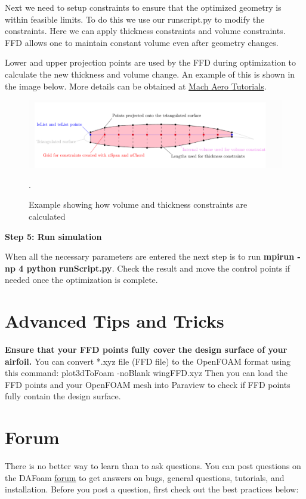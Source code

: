 \documentclass[12pt]{article}
\begin{document}
\noindent Next we need to setup constraints to ensure that the optimized geometry is within feasible limits. To do this we use our runscript.py to modify the constraints. Here we can apply thickness constraints and volume constraints. FFD allows one to maintain constant volume even after geometry changes. \vspace{4mm}
 
\noindent Lower and upper projection points are used by the FFD during optimization to calculate the new thickness and volume change. An example of this is shown in the image below. More details can be obtained at \href{https://mdolab-mach-aero.readthedocs-hosted.com/en/latest/machAeroTutorials/opt_aero.html#geometric-constraints}{Mach Aero Tutorials}. \vspace{4mm}
 
 \begin{figure}[ht]
    \centering
    \includegraphics[width=1.0\textwidth]{thicknessconstraint.PNG}
    \caption{Example showing how volume and thickness constraints are calculated \cite{machaero2021}}.
    \label{fig:my_label}
\end{figure}
 
 
 \noindent \textbf{Step 5: Run simulation}
 
\noindent When all the necessary parameters are entered the next step is to run \textbf{mpirun -np 4 python runScript.py}. Check the result and move the control points if needed once the optimization is complete.

\section{Advanced Tips and Tricks}
\textbf{Ensure that your FFD points fully cover the design surface of your airfoil.} 
You can convert *.xyz file (FFD file) to the OpenFOAM format using this command: plot3dToFoam -noBlank wingFFD.xyz  Then you can load the FFD points and your OpenFOAM mesh into Paraview to check if FFD points fully contain the design surface.\vspace{4mm}

\section{Forum}
There is no better way to learn than to ask questions. You can post questions on the DAFoam \href{https://github.com/mdolab/dafoam/discussions}{forum} to get answers on bugs, general questions, tutorials, and installation. Before you post a question, first check out the best practices below:
\end{document}
